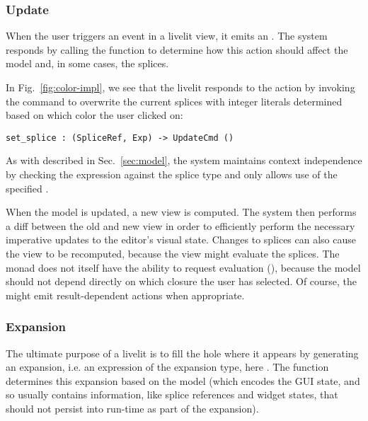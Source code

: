 \subsubsection{Update}\label{sec:def-update}
When the user triggers an event in a livelit view, it emits an .
The system responds by calling the  function to determine how 
this action should affect the model and, in some cases, the splices. 


In Fig.~\ref{fig:color-impl}, we see that the  livelit responds to 
the  action by invoking the  command to overwrite 
the current splices with integer literals determined based on which color the user
clicked on:
\begin{lstlisting}[numbers=none]
  set_splice : (SpliceRef, Exp) -> UpdateCmd ()
\end{lstlisting}
As with  described in Sec.~\ref{sec:model},
the system maintains context independence by checking the expression against the splice type 
and only allows use of the specified .

When the model is updated, a new view is 
computed. The system then performs a diff between the old and new view in order to 
efficiently perform the necessary imperative updates to the editor's visual state.
Changes to splices can also cause the view to be recomputed, because the view might 
evaluate the splices. The  monad does not itself 
have the ability to request evaluation (), because the model should not depend directly  
on which closure the user has selected. 
Of course, the  might emit 
result-dependent actions when appropriate.

\subsubsection{Expansion}
\label{sec:expansion}
The ultimate purpose of a livelit is to fill the hole where it appears by generating an expansion,
i.e. an expression of the expansion type, here .
The  function determines this expansion based on the model 
(which encodes the GUI state, and so usually contains information, like splice references
and widget states, 
that should not persist into run-time as part of the expansion).

